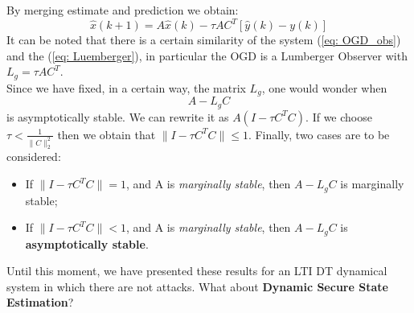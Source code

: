 \hspace*{-5mm}
By merging estimate and prediction we obtain:
\begin{equation}\label{eq: OGD_obs}
	\hat{x}(k+1)=A\hat{x}(k)-\tau AC^T[\hat{y}(k)-y(k)]
\end{equation}
It can be noted that there is a certain similarity of the system (\ref{eq: OGD_obs}) and the (\ref{eq: Luemberger}), in particular the OGD is a Lumberger Observer with $L_g=\tau AC^T$.\\
Since we have fixed, in a certain way, the matrix $L_g$, one would wonder when 
\begin{equation} \label{eq:OGD_dyn}
	A-L_gC
\end{equation}
is asymptotically stable. 
We can rewrite it as $A(I-\tau C^TC)$.
If we choose $\tau<\frac{1}{\lVert C\rVert_2^2}$ then we obtain that 
$\lVert I - \tau C^TC \rVert \le 1$. Finally, two cases are to be considered: 
\begin{itemize}
	\item If $\lVert I - \tau C^TC \rVert = 1$, and A is \textit{marginally stable}, then $A-L_gC$ is marginally stable; 
	\item  If $\lVert I - \tau C^TC \rVert < 1$, and A is \textit{marginally stable}, then  $A-L_gC$ is \textbf{asymptotically stable}.
\end{itemize}

Until this moment, we have presented these results for an LTI DT dynamical system in which there are not attacks. What about \textbf{Dynamic Secure State Estimation}?

